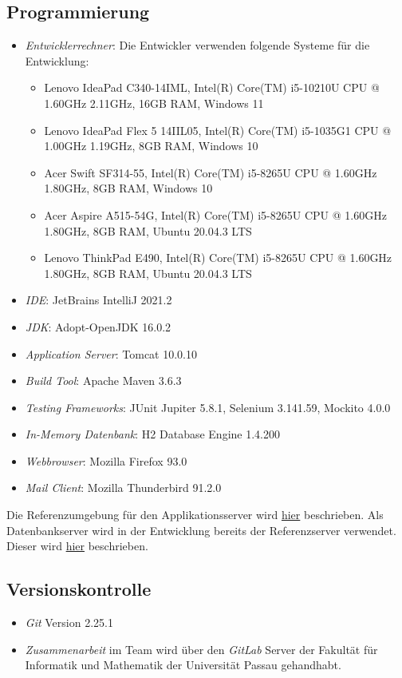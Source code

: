 \subsection{Programmierung}
\begin{itemize}
	\item \emph{Entwicklerrechner}: Die Entwickler verwenden folgende Systeme für die Entwicklung:
		\begin{itemize}
			\item Lenovo IdeaPad C340-14IML, Intel(R) Core(TM) i5-10210U CPU @ 1.60GHz 2.11GHz, 16GB RAM, Windows 11
			\item Lenovo IdeaPad Flex 5 14IIL05, Intel(R) Core(TM) i5-1035G1 CPU @ 1.00GHz 1.19GHz, 8GB RAM, Windows 10
			\item Acer Swift SF314-55, Intel(R) Core(TM) i5-8265U CPU @ 1.60GHz 1.80GHz, 8GB RAM, Windows 10
			\item Acer Aspire A515-54G, Intel(R) Core(TM) i5-8265U CPU @ 1.60GHz 1.80GHz, 8GB RAM, Ubuntu 20.04.3 LTS
			\item Lenovo ThinkPad E490, Intel(R) Core(TM) i5-8265U CPU @ 1.60GHz 1.80GHz, 8GB RAM, Ubuntu 20.04.3 LTS
		\end{itemize}
	\item \emph{IDE}: JetBrains IntelliJ 2021.2
	\item \emph{JDK}: Adopt-OpenJDK 16.0.2
	\item \emph{Application Server}: Tomcat 10.0.10
	\item \emph{Build Tool}: Apache Maven 3.6.3
	\item \emph{Testing Frameworks}: JUnit Jupiter 5.8.1, Selenium 3.141.59, Mockito 4.0.0
	\item \emph{In-Memory Datenbank}: H2 Database Engine 1.4.200
	\item \emph{Webbrowser}: Mozilla Firefox 93.0
	\item \emph{Mail Client}: Mozilla Thunderbird 91.2.0
\end{itemize}
Die Referenzumgebung für den Applikationsserver wird \hyperref[spezi]{hier} beschrieben.
Als Datenbankserver wird in der Entwicklung bereits der Referenzserver verwendet. Dieser wird \hyperref[dbspezi]{hier} beschrieben.
\subsection{Versionskontrolle}
\begin{itemize}
	\item \emph{Git} Version 2.25.1
	\item \emph{Zusammenarbeit} im Team wird über den \emph{GitLab} Server der Fakultät für Informatik und Mathematik der Universität Passau gehandhabt.
\end{itemize}
